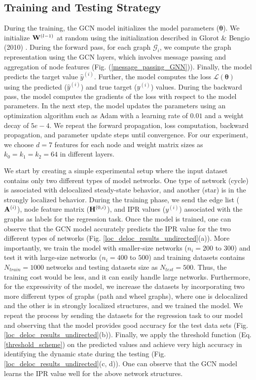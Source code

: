\documentclass[aps, prd, showpacs, floatfix, superscriptaddress, twocolumn, nofootinbib, preprintnumbers, longbibliography]{revtex4-2}
\begin{document}
\subsection{Training and Testing Strategy}
During the training, the GCN model initializes the model parameters ($\bm{\theta}$). We initialize ${\bf W}^{(l-1)}$ at random using the initialization described in Glorot \& Bengio (2010) \cite{glorot2010understanding}. During the forward pass, for each graph $\mathcal{G}_i$, we compute the graph representation using the GCN layers, which involves message passing and aggregation of node features (Fig. (\ref{message_passing_GNN})). Finally, the model predicts the target value $\hat{y}^{(i)}$. Further, the model computes the loss $\mathcal{L}(\bm{\theta})$ using the predicted ($\hat{y}^{(i)}$) and true target ($y^{(i)}$) values. During the backward pass, the model computes the gradients of the loss with respect to the model parameters. In the next step, the model updates the parameters using an optimization algorithm such as Adam with a learning rate of $0.01$ and a weight decay of $5e-4$. We repeat the forward propagation, loss computation, backward propagation, and parameter update steps until convergence. For our experiment, we choose $d=7$ features for each node and weight matrix sizes as $k_0=k_1=k_2=64$ in different layers. 

We start by creating a simple experimental setup where the input dataset contains only two different types of model networks. One type of network (cycle) is associated with delocalized steady-state behavior, and another (star) is in the strongly localized behavior. During the training phase, we send the edge list (${\bf A}^{(i)}$), node feature matrix (${\bf H}^{(0,i)}$), and IPR values ($y^{(i)}$) associated with the graphs as labels for the regression task. Once the model is trained, one can observe that the GCN model accurately predicts the IPR value for the two different types of networks (Fig. \ref{loc_deloc_results_undirected}(a)). More importantly, we train the model with smaller-size networks ($n_i=200$ to $300$) and test it with large-size networks ($n_i=400$ to $500$) and training datasets contains $N_{train}=1000$ networks and testing datasets size as $N_{test}=500$. Thus, the training cost would be less, and it can easily handle large networks. Furthermore, for the expressivity of the model, we increase the datasets by incorporating two more different types of graphs (path and wheel graphs), where one is delocalized and the other is in strongly localized structures, and we trained the model. We repeat the process by sending the datasets for the regression task to our model and observing that the model provides good accuracy for the test data sets (Fig. \ref{loc_deloc_results_undirected}(b)). Finally, we apply the threshold function (Eq. \ref{threshold_scheme}) on the predicted values and achieve very high accuracy in identifying the dynamic state during the testing (Fig. \ref{loc_deloc_results_undirected}(c, d)). One can observe that the GCN model learns the IPR value well for the above network structures.
\end{document}
